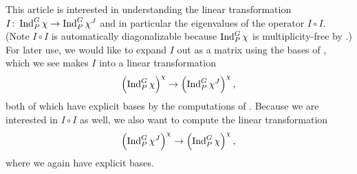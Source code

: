 This article is interested in understanding the linear transformation $I\colon\operatorname{Ind}^G_P\chi\to\operatorname{Ind}^G_P\chi^J$ and in particular the eigenvalues of the operator $I\circ I$. (Note $I\circ I$ is automatically diagonalizable because $\operatorname{Ind}_P^G\chi$ is multiplicity-free by .)
For later use, we would like to expand $I$ out as a matrix using the bases of , which we see makes $I$ into a linear transformation
\[\left(\operatorname{Ind}^G_P\chi\right)^\chi\to\left(\operatorname{Ind}^G_P\chi^J\right)^\chi,\]
both of which have explicit bases by the computations of . Because we are interested in $I\circ I$ as well, we also want to compute the linear transformation
\[\left(\operatorname{Ind}^G_P\chi^J\right)^\chi\to\left(\operatorname{Ind}^G_P\chi\right)^\chi,\]
where we again have explicit bases.

